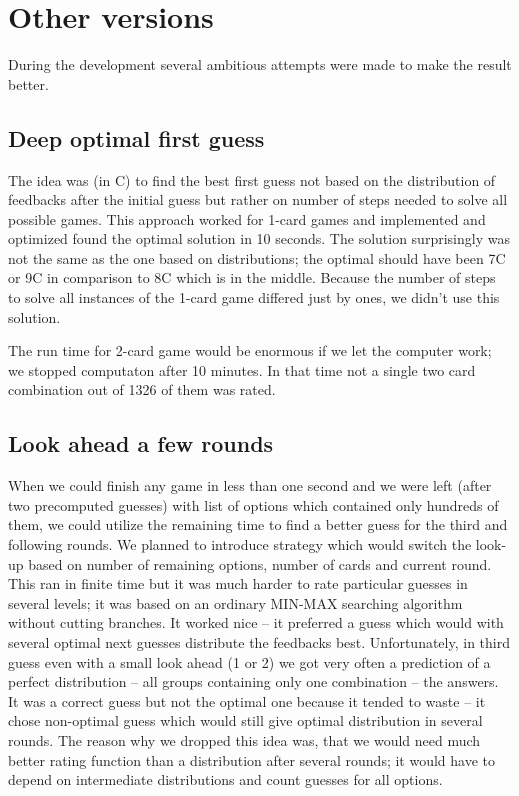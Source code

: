 \documentclass{article}
\begin{document}
\pagebreak

\section{Other versions}

During the development several ambitious attempts were made to make the result better.

\subsection{Deep optimal first guess}

The idea was (in C) to find the best first guess not based on the distribution of feedbacks after the initial guess but rather on number of steps needed to solve all possible games.
This approach worked for 1-card games and implemented and optimized found the optimal solution in 10 seconds.
The solution surprisingly was not the same as the one based on distributions; the optimal should have been 7C or 9C in comparison to 8C which is in the middle.
Because the number of steps to solve all instances of the 1-card game differed just by ones, we didn't use this solution.

The run time for 2-card game would be enormous if we let the computer work; we stopped computaton after 10 minutes.
In that time not a single two card combination out of 1326 of them was rated.

\subsection{Look ahead a few rounds}

When we could finish any game in less than one second and we were left (after two precomputed guesses) with list of options which contained only hundreds of them, we could utilize the remaining time to find a better guess for the third and following rounds.
We planned to introduce strategy which would switch the look-up based on number of remaining options, number of cards and current round.
This ran in finite time but it was much harder to rate particular guesses in several levels; it was based on an ordinary MIN-MAX searching algorithm without cutting branches.
It worked nice -- it preferred a guess which would with several optimal next guesses distribute the feedbacks best.
Unfortunately, in third guess even with a small look ahead (1 or 2) we got very often a prediction of a perfect distribution -- all groups containing only one combination -- the answers.
It was a correct guess but not the optimal one because it tended to waste -- it chose non-optimal guess which would still give optimal distribution in several rounds.
The reason why we dropped this idea was, that we would need much better rating function than a distribution after several rounds; it would have to depend on intermediate distributions and count guesses for all options.
\end{document}
